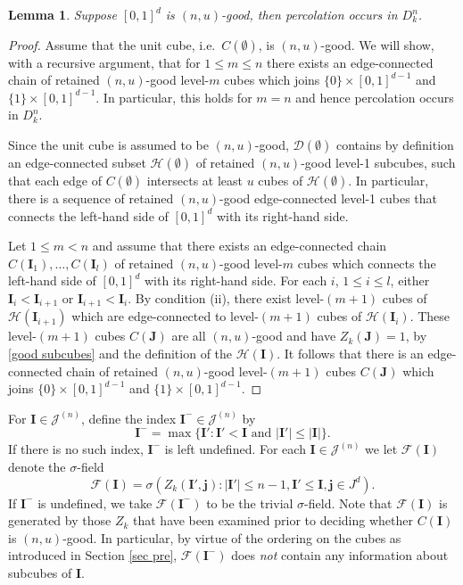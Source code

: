 \documentclass[11pt,a4paper]{article}
\newcommand{\Ib}{\ensuremath{\mathbf{I}}}
\newcommand{\Jb}{\ensuremath{\mathbf{J}}}
\newcommand{\Ij}{\ensuremath{\mathbf{j}}}
\newcommand{\DD}{\ensuremath{\mathcal{D}}}
\newcommand{\JJ}{\ensuremath{\mathcal{J}}}
\newcommand{\FF}{\ensuremath{\mathcal{F}}}
\newcommand{\HH}{\ensuremath{\mathcal{H}}}
\newtheorem{lemma}[theorem]{Lemma}
\theoremstyle{remark}
\begin{document}
\begin{lemma}\label{lem good}
 Suppose $[0,1]^d$ is $(n,u)$-good, then percolation occurs in $D_{k}^{n}$.
\end{lemma}

\begin{proof}
Assume that the unit cube, i.e.\ $C(\emptyset)$, is $(n,u)$-good. We will show, with a recursive argument, that for $1\leq m \leq n$ there exists an edge-connected chain of retained $(n,u)$-good level-$m$ cubes which joins $\{0\} \times [0,1]^{d-1}$ and $\{1\} \times [0,1]^{d-1}$. In particular, this holds for $m=n$ and hence percolation occurs in $D_k^n$.


Since the unit cube is assumed to be $(n,u)$-good, $\DD(\emptyset)$ contains by definition an edge-connected subset $\HH(\emptyset)$ of retained $(n,u)$-good level-1 subcubes, such that each edge of $C(\emptyset)$ intersects at least $u$ cubes of $\HH(\emptyset)$. In particular, there is a sequence of retained $(n,u)$-good edge-connected level-1 cubes that connects the left-hand side of $[0,1]^d$ with its right-hand side.


Let $1\leq m < n$ and assume that there exists an edge-connected chain $C(\Ib_1),\ldots,C(\Ib_l)$ of retained $(n,u)$-good level-$m$ cubes which connects the left-hand side of $[0,1]^d$ with its right-hand side. For each $i$, $1 \leq i \leq l$, either $\Ib_i < \Ib_{i+1}$ or $\Ib_{i+1}<\Ib_i$. By condition (ii), there exist level-$(m+1)$ cubes of $\HH(\Ib_{i+1})$ which are edge-connected to level-$(m+1)$ cubes of $\HH(\Ib_i)$. These level-$(m+1)$ cubes $C(\Jb)$ are all $(n,u)$-good and have $Z_k(\Jb)=1$, by \eqref{good subcubes} and the definition of the $\HH(\Ib)$. It follows that there is an edge-connected chain of retained $(n,u)$-good level-$(m+1)$ cubes $C(\Jb)$ which joins $\{0\} \times [0,1]^{d-1}$ and $\{1\} \times [0,1]^{d-1}$. 
\end{proof}


For $\Ib \in \JJ^{(n)}$, define the index $\Ib^- \in \JJ^{(n)}$ by
\[
 \Ib^- = \max\{ \Ib': \Ib' < \Ib \text{ and } |\Ib'| \leq |\Ib| \}.
\]
If there is no such index, $\Ib^-$ is left undefined. For each $\Ib \in \JJ^{(n)}$ we let $\FF(\Ib)$ denote the $\sigma$-field 
\[
 \FF(\Ib) = \sigma(Z_k(\Ib',\Ij): |\Ib'| \leq n-1, \Ib' \leq \Ib, \Ij \in J^{d}).
\]
If $\Ib^-$ is undefined, we take $\FF(\Ib^-)$ to be the trivial $\sigma$-field. Note that $\FF(\Ib)$ is generated by those $Z_k$ that have been examined prior to deciding whether $C(\Ib)$ is $(n,u)$-good. In particular, by virtue of the ordering on the cubes as introduced in Section \ref{sec pre}, $\FF(\Ib^-)$ does \emph{not} contain any information about subcubes of $\Ib$. 
\end{document}
